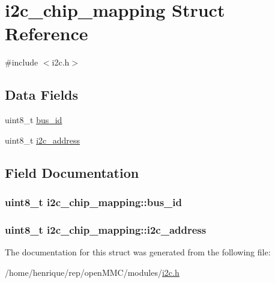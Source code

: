 \hypertarget{structi2c__chip__mapping}{\section{i2c\-\_\-chip\-\_\-mapping Struct Reference}
\label{structi2c__chip__mapping}
}


{\ttfamily \#include $<$i2c.\-h$>$}

\subsection*{Data Fields}
\begin{DoxyCompactItemize}
\item 
uint8\-\_\-t \hyperlink{structi2c__chip__mapping_adc2f0f14f1e933d1ae6b3db17c387e0c}{bus\-\_\-id}
\item 
uint8\-\_\-t \hyperlink{structi2c__chip__mapping_a0185d517054a83472ec941cdf51da01c}{i2c\-\_\-address}
\end{DoxyCompactItemize}


\subsection{Field Documentation}
\hypertarget{structi2c__chip__mapping_adc2f0f14f1e933d1ae6b3db17c387e0c}{
\subsubsection[{bus\-\_\-id}]{\setlength{\rightskip}{0pt plus 5cm}uint8\-\_\-t i2c\-\_\-chip\-\_\-mapping\-::bus\-\_\-id}}\label{structi2c__chip__mapping_adc2f0f14f1e933d1ae6b3db17c387e0c}
\hypertarget{structi2c__chip__mapping_a0185d517054a83472ec941cdf51da01c}{
\subsubsection[{i2c\-\_\-address}]{\setlength{\rightskip}{0pt plus 5cm}uint8\-\_\-t i2c\-\_\-chip\-\_\-mapping\-::i2c\-\_\-address}}\label{structi2c__chip__mapping_a0185d517054a83472ec941cdf51da01c}


The documentation for this struct was generated from the following file\-:\begin{DoxyCompactItemize}
\item 
/home/henrique/rep/open\-M\-M\-C/modules/\hyperlink{i2c_8h}{i2c.\-h}\end{DoxyCompactItemize}
